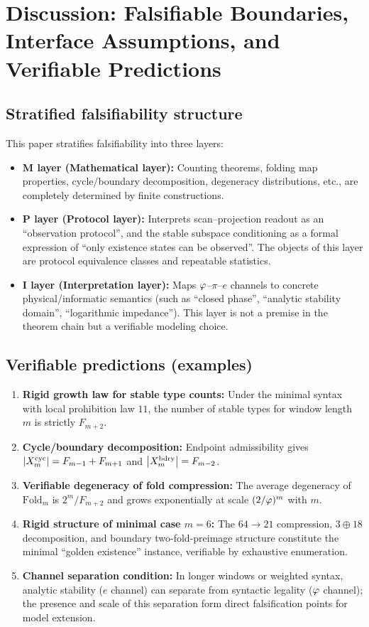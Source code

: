 \section{Discussion: Falsifiable Boundaries, Interface Assumptions, and Verifiable Predictions}

\subsection{Stratified falsifiability structure}

This paper stratifies falsifiability into three layers:
\begin{itemize}
  \item \textbf{M layer (Mathematical layer):} Counting theorems, folding map properties, cycle/boundary decomposition, degeneracy distributions, etc., are completely determined by finite constructions.
  \item \textbf{P layer (Protocol layer):} Interprets scan--projection readout as an ``observation protocol'', and the stable subspace conditioning as a formal expression of ``only existence states can be observed''. The objects of this layer are protocol equivalence classes and repeatable statistics.
  \item \textbf{I layer (Interpretation layer):} Maps $\varphi$--$\pi$--$e$ channels to concrete physical/informatic semantics (such as ``closed phase'', ``analytic stability domain'', ``logarithmic impedance''). This layer is not a premise in the theorem chain but a verifiable modeling choice.
\end{itemize}

\subsection{Verifiable predictions (examples)}

\begin{enumerate}
  \item \textbf{Rigid growth law for stable type counts:} Under the minimal syntax with local prohibition law $11$, the number of stable types for window length $m$ is strictly $F_{m+2}$.
  \item \textbf{Cycle/boundary decomposition:} Endpoint admissibility gives $\left\lvert X_m^{\mathrm{cyc}}\right\rvert=F_{m-1}+F_{m+1}$ and $\left\lvert X_m^{\mathrm{bdry}}\right\rvert=F_{m-2}$.
  \item \textbf{Verifiable degeneracy of fold compression:} The average degeneracy of $\mathrm{Fold}_m$ is $2^m/F_{m+2}$ and grows exponentially at scale $(2/\varphi)^m$ with $m$.
  \item \textbf{Rigid structure of minimal case $m=6$:} The $64\to 21$ compression, $3\oplus 18$ decomposition, and boundary two-fold-preimage structure constitute the minimal ``golden existence'' instance, verifiable by exhaustive enumeration.
  \item \textbf{Channel separation condition:} In longer windows or weighted syntax, analytic stability ($e$ channel) can separate from syntactic legality ($\varphi$ channel); the presence and scale of this separation form direct falsification points for model extension.
\end{enumerate}
